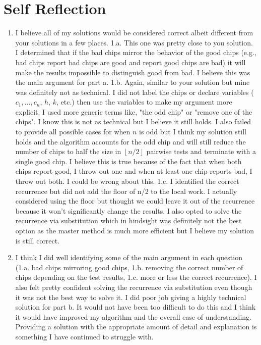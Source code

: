 \documentclass[11pt]{article}
\theoremstyle{nonumberplain}
\begin{document}
\section*{Self Reflection}


\begin{enumerate}
\item I believe all of my solutions would be considered correct albeit different from your solutions in a few places. 1.a. This one was pretty close to you solution. I determined that if the bad chips mirror the behavior of the good chips (e.g., bad chips report bad chips are good and report good chips are bad) it will make the results impossible to distinguish good from bad. I believe this was the main argument for part a. 1.b. Again, similar to your solution but mine was definitely not as technical. I did not label the chips or declare variables ($c_1,...,c_n$, $h$, $k$, etc.) then use the variables to make my argument more explicit. I used more generic terms like, "the odd chip" or "remove one of the chips". I know this is not as technical but I believe it still holds. I also failed to provide all possible cases for when $n$ is odd but I think my solution still holds and the algorithm accounts for the odd chip and will still reduce the number of chips to half the size in $\left \lfloor{n/2} \right \rfloor$ pairwise tests and terminate with a single good chip. I believe this is true because of the fact that when both chips report good, I throw out one and when at least one chip reports bad, I throw out both. I could be wrong about this. 1.c. I identified the correct recurrence but did not add the floor of n/2 to the local work. I actually considered using the floor but thought we could leave it out of the recurrence because it won't significantly change the results. I also opted to solve the recurrence via substitution which in hindsight was definitely not the best option as the master method is much more efficient but I believe my solution is still correct.      
\item I think I did well identifying some of the main argument in each question (1.a. bad chips mirroring good chips, 1.b. removing the correct number of chips depending on the test results, 1.c. more or less the correct recurrence). I also felt pretty confident solving the recurrence via substitution even though it was not the best way to solve it. I did poor job giving a highly technical solution for part b. It would not have been too difficult to do this and I think it would have improved my algorithm and the overall ease of understanding. Providing a solution with the appropriate amount of detail and explanation is something I have continued to struggle with.  

\end{enumerate}
\end{document}
